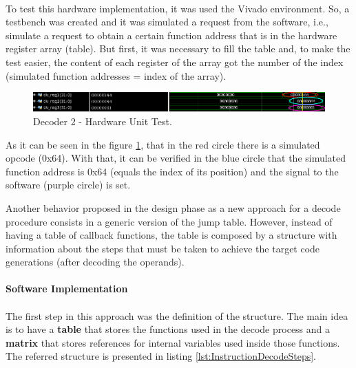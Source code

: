\paragraph{}

To test this hardware implementation, it was used the Vivado environment. So, a testbench was created and it was simulated a request from the software, i.e., simulate a request to obtain a certain function address that is in the hardware register array (table). But first, it was necessary to fill the table and, to make the test easier, the content of each register of the array got the number of the index (simulated function addresses = index of the array).

\begin{figure}[H]
\centerline{
\includegraphics[scale=0.5]{images/test_bench}
}
\caption{Decoder 2 - Hardware Unit Test.}
\label{fig:test_bench} 
\end{figure}

As it can be seen in the figure \ref{fig:test_bench}, that in the red circle there is a simulated opcode (0x64). With that, it can be verified in the blue circle that the simulated function address is 0x64 (equals the index of its position) and the signal to the software (purple circle) is set. 

Another behavior proposed in the design phase as a new approach for a decode procedure consists in a generic version of the jump table. However, instead of having a table of callback functions, the table is composed by a structure with information about the steps that must be taken to achieve the target code generations (after decoding the operands).

\paragraph{Software Implementation}

\paragraph{}

The first step in this approach was the definition of the structure. The main idea is to have a \textbf{table} that stores the functions used in the decode process and a \textbf{matrix} that stores references for internal variables used inside those functions. The referred structure is presented in listing \ref{lst:InstructionDecodeSteps}.

